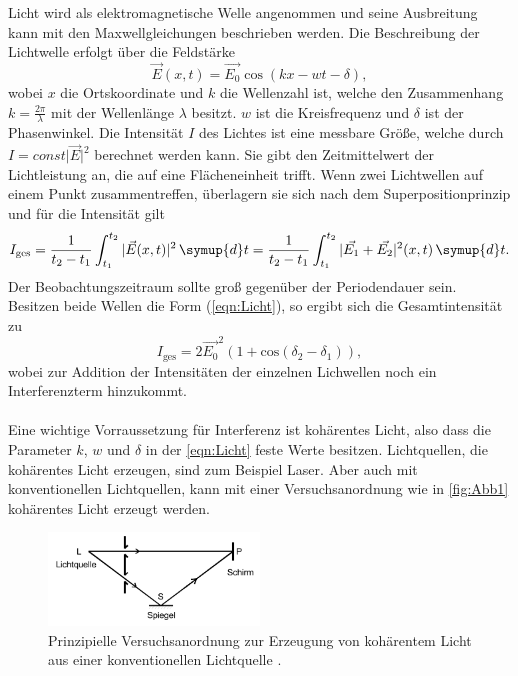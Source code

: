 Licht wird als elektromagnetische Welle angenommen und seine Ausbreitung kann mit den Maxwellgleichungen beschrieben werden.
Die Beschreibung der Lichtwelle erfolgt über die Feldstärke
\begin{equation}
    \vec{E}(x,t) = \vec{E_0} \cos(kx-wt-\delta),
    \label{eqn:Licht}
\end{equation}
wobei $x$ die Ortskoordinate und $k$ die Wellenzahl ist, welche den Zusammenhang $k = \frac{2\pi}{\lambda}$ mit der Wellenlänge $\lambda$ besitzt. 
$w$ ist die Kreisfrequenz und $\delta$ ist der Phasenwinkel.
Die Intensität $I$ des Lichtes ist eine messbare Größe, welche durch $I = const \lvert \vec{E} \rvert^2$ berechnet werden kann.
Sie gibt den Zeitmittelwert der Lichtleistung an, die auf eine Flächeneinheit trifft. 
Wenn zwei Lichtwellen auf einem Punkt zusammentreffen, überlagern sie sich nach dem Superpositionprinzip und für die Intensität gilt
\begin{equation*}
    I_{\text{ges}} = \frac{1}{t_2 - t_1} \int_{t_1}^{t_2} | \vec{E}(x,t)|^2 \, \symup{d}t  = \frac{1}{t_2 - t_1} \int_{t_1}^{t_2} | \vec{E_1}+ \vec{E_2}|^2 (x,t) \, \symup{d}t .
\end{equation*}
Der Beobachtungszeitraum sollte groß gegenüber der Periodendauer sein.\\
Besitzen beide Wellen die Form (\ref{eqn:Licht}), so ergibt sich die Gesamtintensität zu 
\begin{equation*}
    I_{\text{ges}} = 2\vec{E_0}^2(1+\text{cos}(\delta_2 - \delta_1)), 
\end{equation*}
wobei zur Addition der Intensitäten der einzelnen Lichwellen noch ein Interferenzterm hinzukommt.\\
\\
Eine wichtige Vorraussetzung für Interferenz ist kohärentes Licht, also dass die Parameter $k$, $w$ und $\delta$ in der 
\autoref{eqn:Licht} feste Werte besitzen.
Lichtquellen, die kohärentes Licht erzeugen, sind zum Beispiel Laser. 
Aber auch mit konventionellen Lichtquellen, kann mit einer Versuchsanordnung wie in \autoref{fig:Abb1} kohärentes Licht erzeugt werden.
\begin{figure}[H]
    \centering
    \includegraphics[width=0.5\textwidth]{build/Abb1.PNG}
    \caption {Prinzipielle Versuchsanordnung zur Erzeugung von kohärentem Licht aus einer konventionellen Lichtquelle \cite[3]{V401}.}
    \label{fig:Abb1}
\end{figure}

